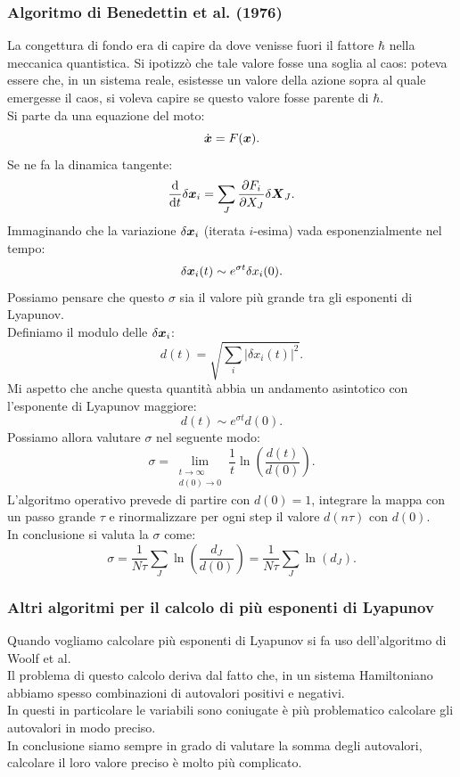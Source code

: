 \subsubsection{Algoritmo di Benedettin et al. (1976)}%
\label{subsub:Algoritmo di Benedettin et al. (1976)}
La congettura di fondo era di capire da dove venisse fuori il fattore $\hbar $ nella meccanica quantistica. Si ipotizzò che tale valore fosse una soglia al caos: poteva essere che, in un sistema reale, esistesse un valore della azione sopra al quale emergesse il caos, si voleva capire se questo valore fosse parente di $\hbar $.\\
Si parte da una equazione del moto:
\[
    \dot{\boldsymbol{x}}=F(\boldsymbol{x})
.\] 
Se ne fa la dinamica tangente:
\[
    \frac{\text{d} }{\text{d} t} \delta\boldsymbol{x}_i = \sum_{J}^{} \frac{\partial F_i}{\partial X_J} \delta\boldsymbol{X}_J
.\] 
Immaginando che la variazione $\delta\boldsymbol{x}_i$ (iterata $i$-esima) vada esponenzialmente nel tempo:
\[
    \delta\boldsymbol{x}_i(t) \sim e^{\sigma t}\delta x_i(0)
.\] 
Possiamo pensare che questo $\sigma$ sia il valore più grande tra gli esponenti di Lyapunov.\\
Definiamo il modulo delle $\delta\boldsymbol{x}_i$:
\[
    d(t)=\sqrt{\sum_{i}^{} \left|\delta x_i(t)\right|^2} 
.\] 
Mi aspetto che anche questa quantità abbia un andamento asintotico con l'esponente di Lyapunov maggiore:
\[
    d(t)\sim e^{\sigma t}d(0)
.\] 
Possiamo allora valutare $\sigma$ nel seguente modo:
\[
    \sigma  = \lim_{\substack{t \to \infty \\ d(0)\to 0}} \frac{1}{t}\ln\left(\frac{d(t)}{d(0)}\right)
.\] 
L'algoritmo operativo prevede di partire con $d(0) = 1$, integrare la mappa con un passo grande $\tau$ e rinormalizzare per ogni step il valore $d(n\tau)$ con $d(0)$. \\
In conclusione si valuta la $\sigma$ come:
\[
    \sigma  = \frac{1}{N\tau}\sum_{J}^{} \ln\left(\frac{d_J}{d(0)}\right)=\frac{1}{N\tau}\sum_{J}^{} \ln\left(d_J\right)
.\] 
\subsubsection{Altri algoritmi per il calcolo di più esponenti di Lyapunov}%
\label{subsub:Altri algoritmi per il calcolo di più esponenti di Lyapunov}
Quando vogliamo calcolare più esponenti di Lyapunov si fa uso dell'algoritmo di Woolf et al.\\
Il problema di questo calcolo deriva dal fatto che, in un sistema Hamiltoniano abbiamo spesso combinazioni di autovalori positivi e negativi. \\
In questi in particolare le variabili sono coniugate è più problematico calcolare gli autovalori in modo preciso.\\
In conclusione siamo sempre in grado di valutare la somma degli autovalori, calcolare il loro valore preciso è molto più complicato.
\clearpage
